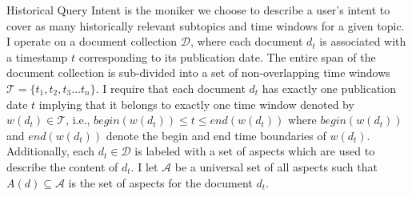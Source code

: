 


Historical Query Intent is the moniker we choose to describe a user's intent to cover as many historically relevant subtopics and time windows for a given topic. I operate on a document collection $\mathcal{D}$, where each document $d_t$ is associated with a timestamp $t$ corresponding to its publication date. The entire span of the document collection is sub-divided into a set of non-overlapping time windows $\mathcal{T} = \{t_1,t_2,t_3 ... t_n \}$. I require that each document $d_t$ has exactly one publication date $t$ implying that it belongs to exactly one time window denoted by $w(d_t) \in \mathcal{T}$, i.e., $begin(w(d_t)) \leq t \leq end(w(d_t))$ where $begin(w(d_t))$ and $end(w(d_t))$ denote the begin and end time boundaries of $w(d_t)$. Additionally, each $d_t \in \mathcal{D}$ is labeled with a set of aspects which are used to describe the content of $d_t$. I let $\mathcal{A}$ be a universal set of all aspects such that $A(d) \subseteq \mathcal{A}$ is the set of aspects for the document $d_t$. 


